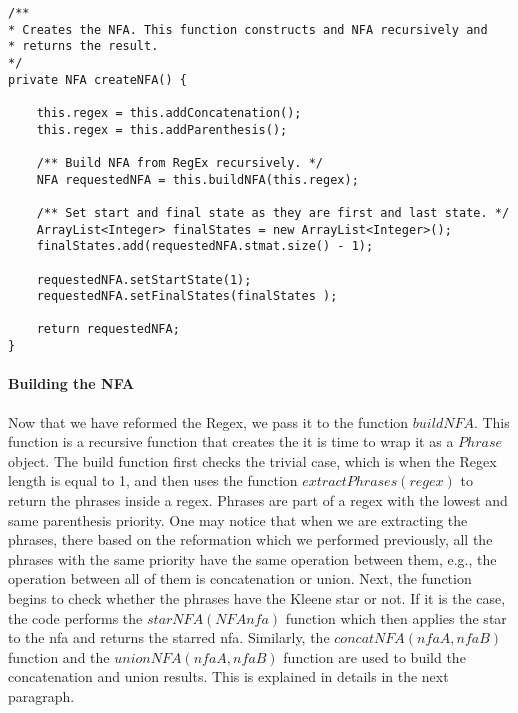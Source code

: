 \documentclass[
12pt, %
a4paper, %
oneside, %
headinclude,footinclude, %
BCOR5mm, %
]{scrartcl}
\begin{document}
\newpage
\begin{lstlisting}
/**
* Creates the NFA. This function constructs and NFA recursively and
* returns the result.
*/
private NFA createNFA() {

	this.regex = this.addConcatenation();
	this.regex = this.addParenthesis();
	
	/** Build NFA from RegEx recursively. */
	NFA requestedNFA = this.buildNFA(this.regex);
	
	/** Set start and final state as they are first and last state. */
	ArrayList<Integer> finalStates = new ArrayList<Integer>();
	finalStates.add(requestedNFA.stmat.size() - 1);
	
	requestedNFA.setStartState(1);
	requestedNFA.setFinalStates(finalStates );
	
	return requestedNFA;
}
\end{lstlisting}

\paragraph{Building the NFA}
Now that we have reformed the Regex, we pass it to the function $buildNFA$. This function is a recursive function that creates the it is time to wrap it as a $Phrase$ object. The build function first checks the trivial case, which is when the Regex length is equal to 1, and then uses the function $extractPhrases(regex)$ to return the phrases inside a regex. Phrases are part of a regex with the lowest and same parenthesis priority. One may notice that when we are extracting the phrases, there based on the reformation which we performed previously, all the phrases with the same priority have the same operation between them, e.g., the operation between all of them is concatenation or union. Next, the function begins to check whether the phrases have the Kleene star or not. If it is the case, the code performs the $starNFA(NFA nfa)$ function which then applies the star to the nfa and returns the starred nfa. Similarly, the $concatNFA(nfaA, nfaB)$ function and the $unionNFA(nfaA, nfaB)$ function are used to build the concatenation and union results. This is explained in details in the next paragraph.
\end{document}
